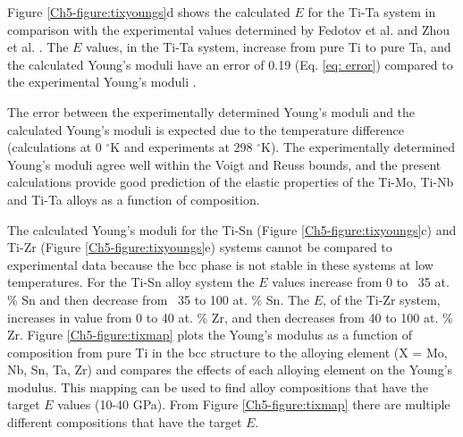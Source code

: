 Figure \ref{Ch5-figure:tixyoungs}d shows the calculated $E$ for the Ti-Ta system in comparison with the experimental values determined by Fedotov et al. \cite{Fedotov1985} and Zhou et al. \cite{Zhou2004a,Zhou2009a}. The $E$ values, in the Ti-Ta system, increase from pure Ti to pure Ta, and the calculated Young's moduli have an error of 0.19 (Eq. \ref{eq: error}) compared to the experimental Young's moduli \cite{Fedotov1985,Zhou2004a,Zhou2009a}.  

The error between the experimentally determined Young's moduli and the calculated Young's moduli is expected due to the temperature difference (calculations at 0 $^\circ$K and experiments at 298 $^\circ$K). The experimentally determined Young's moduli agree well within the Voigt and Reuss bounds, and the present calculations provide good prediction of the elastic properties of the Ti-Mo, Ti-Nb and Ti-Ta alloys as a function of composition.

The calculated Young's moduli for the Ti-Sn (Figure \ref{Ch5-figure:tixyoungs}c) and Ti-Zr (Figure \ref{Ch5-figure:tixyoungs}e) systems cannot be compared to experimental data because the bcc phase is not stable in these systems at low temperatures. For the Ti-Sn alloy system the $E$ values increase from 0 to ~35 at. \% Sn and then decrease from ~35 to 100 at. \% Sn. The $E$, of the Ti-Zr system, increases in value from 0 to 40 at. \% Zr, and then decreases from 40 to 100 at. \% Zr. Figure \ref{Ch5-figure:tixmap} plots the Young's modulus as a function of composition from pure Ti in the bcc structure to the alloying element (X = Mo, Nb, Sn, Ta, Zr) and compares the effects of each alloying element on the Young's modulus. This mapping can be used to find alloy compositions that have the target $E$ values (10-40 GPa). From Figure \ref{Ch5-figure:tixmap}  there are multiple different compositions that have the target $E$.

